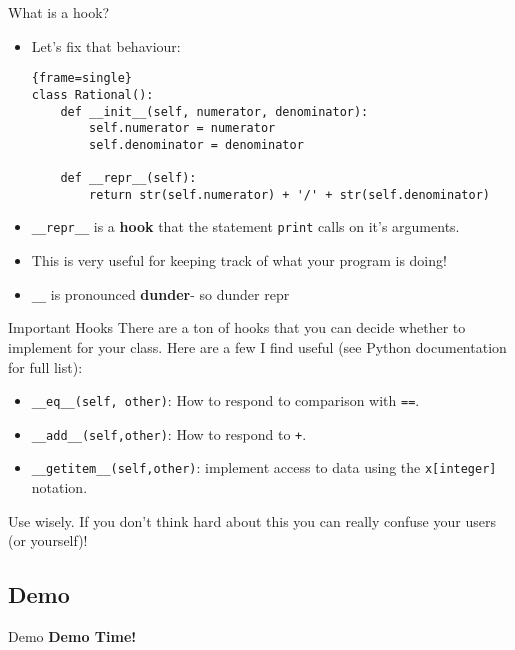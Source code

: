 \documentclass{beamer}
\newcommand{\snippet}{\lstinline}
\begin{document}
\begin{frame}[fragile]{What is a hook?}
	\begin{itemize}
	\item { Let's fix that behaviour:
  \begin{block}{}
\begin{lstlisting}{frame=single}
class Rational():
    def __init__(self, numerator, denominator):
        self.numerator = numerator
        self.denominator = denominator

    def __repr__(self):
        return str(self.numerator) + '/' + str(self.denominator)
\end{lstlisting}
\end{block}
	}
	\pause
	\item { \snippet{__repr__} is a \textbf{hook} that the statement \snippet{print} calls on 
	it's arguments.}
	\pause
	\item {This is very useful for keeping track of what your program is doing!}
	\item {\snippet{__} is pronounced \textbf{dunder}- so dunder repr}
	\end{itemize}
\end{frame}

\begin{frame}[fragile]{Important Hooks}
	There are a ton of hooks that you can decide whether to implement for your class. Here are a few I find useful (see Python documentation for full list):
	\begin{itemize}
	\item {\snippet{__eq__(self, other)}: How to respond to comparison with \snippet{==}.}
	\item {\snippet{__add__(self,other)}: How to respond to \snippet{+}}.
	\item{\snippet{__getitem__(self,other)}: implement access to data using the \snippet{x[integer]} notation.}
	\end{itemize}
	Use wisely. If you don't think hard about this you can really confuse your users (or yourself)!
\end{frame}

\subsection{Demo}
\begin{frame}[fragile]{Demo}
	 \huge{\textbf{Demo Time!}}
\end{frame}
\end{document}
